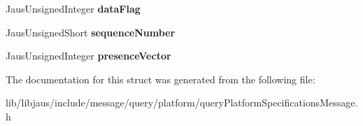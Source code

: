 \begin{DoxyCompactItemize}
\item 
\hypertarget{struct_query_platform_specifications_message_struct_a918f12c66b816f20d3df774ec878ce4c}{\-Jaus\-Unsigned\-Integer {\bfseries data\-Flag}}\label{struct_query_platform_specifications_message_struct_a918f12c66b816f20d3df774ec878ce4c}

\item 
\hypertarget{struct_query_platform_specifications_message_struct_aca95925f92bad6abaa0293cc91630974}{\-Jaus\-Unsigned\-Short {\bfseries sequence\-Number}}\label{struct_query_platform_specifications_message_struct_aca95925f92bad6abaa0293cc91630974}

\item 
\hypertarget{struct_query_platform_specifications_message_struct_a2f744a22cc8ac3f8fde19b8f9cd7c253}{\-Jaus\-Unsigned\-Integer {\bfseries presence\-Vector}}\label{struct_query_platform_specifications_message_struct_a2f744a22cc8ac3f8fde19b8f9cd7c253}

\end{DoxyCompactItemize}


\-The documentation for this struct was generated from the following file\-:\begin{DoxyCompactItemize}
\item 
lib/libjaus/include/message/query/platform/query\-Platform\-Specifications\-Message.\-h\end{DoxyCompactItemize}
